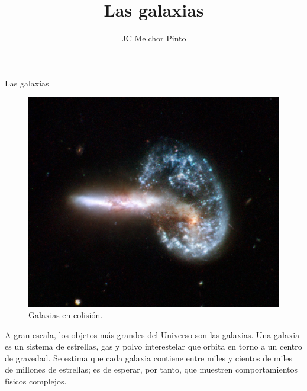 \documentclass[12pt,addpoints]{guia}
\title{Las galaxias}
\author{JC Melchor Pinto}
\begin{document}
\INFO%
\begin{sectionbox}{Las galaxias}
    \begin{figure}
        \centering
        \includegraphics[width=\linewidth]{../images/fusion-galaxie-arp148}
        \caption{Galaxias en colisión.}
        \label{fig:fusion-galaxie-arp148}
    \end{figure}
    A gran escala, los objetos más grandes del Universo son las galaxias.
    \label{085a_a}Una galaxia es un sistema de estrellas, gas y polvo
    interestelar que orbita en torno a un centro de gravedad.
    Se estima que cada galaxia contiene entre miles y cientos de miles de millones de estrellas; es de esperar, por
    tanto, que muestren comportamientos físicos complejos.


\end{sectionbox}
\end{document}
